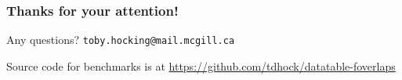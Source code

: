 \documentclass{beamer}
\begin{document}
\begin{frame}
  \frametitle{Thanks for your attention!}
  Any questions? \texttt{toby.hocking@mail.mcgill.ca}

  \vskip 1cm

  Source code for benchmarks is at
  \url{https://github.com/tdhock/datatable-foverlaps}
\end{frame}
\end{document}
